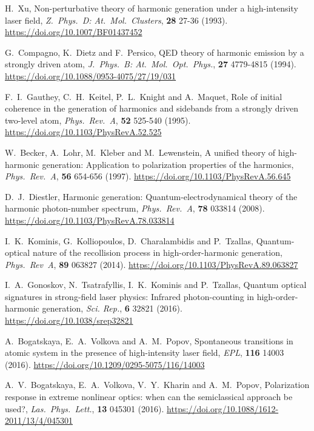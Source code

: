 \begin{thebibliography}{}
    H.\ Xu, Non-perturbative theory of harmonic generation under a high-intensity laser field, \emph{Z.\ Phys.\ D: At.\ Mol.\ Clusters}, \textbf{28} 27-36 (1993). \url{https://doi.org/10.1007/BF01437452}
    
    G.\ Compagno, K.\ Dietz and F.\ Persico, QED theory of harmonic emission by a strongly driven atom, \emph{J.\ Phys.\ B: At.\ Mol.\ Opt.\ Phys.}, \textbf{27} 4779-4815 (1994). \url{https://doi.org/10.1088/0953-4075/27/19/031}

    F.\ I.\ Gauthey, C.\ H.\ Keitel, P.\ L.\ Knight and A.\ Maquet, Role of initial coherence in the generation of harmonics and sidebands from a strongly driven two-level atom, \emph{Phys.\ Rev.\ A}, \textbf{52} 525-540 (1995). \url{https://doi.org/10.1103/PhysRevA.52.525}

    W.\ Becker, A.\ Lohr, M.\ Kleber and M.\ Lewenstein, A unified theory of high-harmonic generation: Application to polarization properties of the harmonics, \emph{Phys.\ Rev.\ A}, \textbf{56} 654-656 (1997). \url{https://doi.org/10.1103/PhysRevA.56.645}

    D.\ J.\ Diestler, Harmonic generation: Quantum-electrodynamical theory of the harmonic photon-number spectrum, \emph{Phys.\ Rev.\ A}, \textbf{78} 033814 (2008). \url{https://doi.org/10.1103/PhysRevA.78.033814}

    I.\ K.\ Kominis, G.\ Kolliopoulos, D.\ Charalambidis and P.\ Tzallas, Quantum-optical nature of the recollision process in high-order-harmonic generation, \emph{Phys.\ Rev\ A}, \textbf{89} 063827 (2014). \url{https://doi.org/10.1103/PhysRevA.89.063827}

    I.\ A.\ Gonoskov, N.\ Tsatrafyllis, I.\ K.\ Kominis and P.\ Tzallas, Quantum optical signatures in strong-field laser physics: Infrared photon-counting in high-order-harmonic generation, \emph{Sci. Rep.}, \textbf{6} 32821 (2016). \url{https://doi.org/10.1038/srep32821}
    
    A.\ Bogatskaya, E.\ A.\ Volkova and A.\ M.\ Popov, Spontaneous transitions in atomic system in the presence of high-intensity laser field, \emph{EPL}, \textbf{116} 14003 (2016). \url{https://doi.org/10.1209/0295-5075/116/14003}

    A.\ V.\ Bogatskaya, E.\ A.\ Volkova, V.\ Y.\ Kharin and A.\ M.\ Popov, Polarization response in extreme nonlinear optics: when can the semiclassical approach be used?, \emph{Las.\ Phys.\ Lett.}, \textbf{13} 045301 (2016). \url{https://doi.org/10.1088/1612-2011/13/4/045301}
    

\end{thebibliography}
